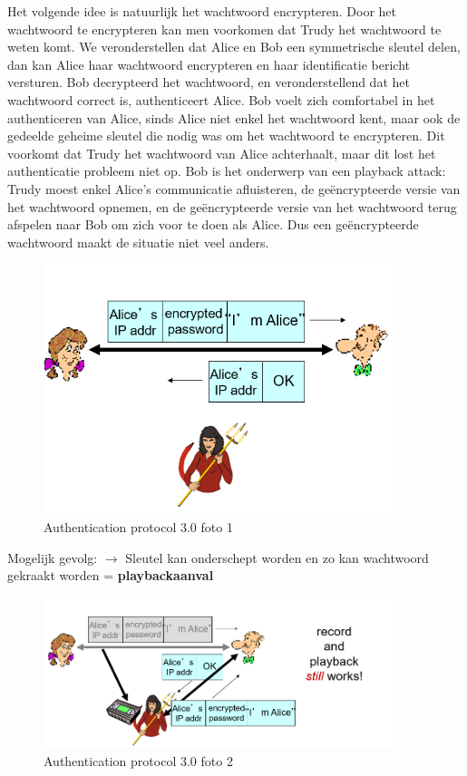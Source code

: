 \noindent Het volgende idee is natuurlijk het wachtwoord encrypteren. Door het wachtwoord te encrypteren kan men voorkomen dat Trudy het wachtwoord te weten komt. We veronderstellen dat Alice en Bob een symmetrische sleutel delen, dan kan Alice haar wachtwoord encrypteren en haar identificatie bericht versturen. Bob decrypteerd het wachtwoord, en veronderstellend dat het wachtwoord correct is, authenticeert Alice. Bob voelt zich comfortabel in het authenticeren van Alice, sinds Alice niet enkel het wachtwoord kent, maar ook de gedeelde geheime sleutel die nodig was om het wachtwoord te encrypteren.
Dit voorkomt dat Trudy het wachtwoord van Alice achterhaalt, maar dit lost het authenticatie probleem niet op. Bob is het onderwerp van een playback attack: Trudy moest enkel Alice’s communicatie afluisteren, de geëncrypteerde versie van het wachtwoord opnemen, en de geëncrypteerde versie van het wachtwoord terug afspelen naar Bob om zich voor te doen als Alice. Dus een geëncrypteerde wachtwoord maakt de situatie niet veel anders.

\begin{figure}[h]
    \centering
    \includegraphics[width=4in]{./img/imghfdst8/hfdst8puntje18.png}
    \caption{Authentication protocol 3.0 foto 1 }      
    \label{fig:Authentication protocol 3.0 foto 1 }
\end{figure}

\noindent Mogelijk gevolg: $\rightarrow$ Sleutel kan onderschept worden en zo kan wachtwoord gekraakt worden = \textbf{playbackaanval}

\begin{figure}[h]
    \centering
    \includegraphics[width=4in]{./img/imghfdst8/hfdst8puntje19.png}
    \caption{Authentication protocol 3.0 foto 2 }      
    \label{fig:Authentication protocol 3.0 foto 2}
\end{figure}

